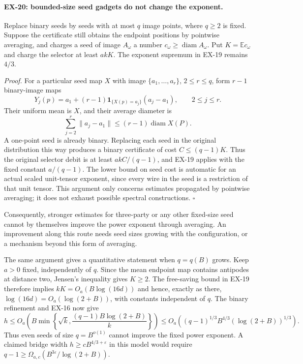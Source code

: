\paragraph{EX-20: bounded-size seed gadgets do not change the exponent.}
Replace binary seeds by seeds with at most $q$ image points, where
$q\geq2$ is fixed. Suppose the certificate still obtains the endpoint
positions by pointwise averaging, and charges a seed of image $A_\omega$
a number $c_\omega\geq\operatorname{diam}A_\omega$. Put
$K=\mathbb E c_\omega$ and charge the selector at least $akK$.
The exponent supremum in EX-19 remains $4/3$.

\emph{Proof.}
For a particular seed map $X$ with image
$\{a_1,\ldots,a_r\}$, $2\leq r\leq q$, form $r-1$ binary-image maps
\[
 Y_j(p)=a_1+(r-1)\mathbf 1_{\{X(p)=a_j\}}(a_j-a_1),
 \qquad 2\leq j\leq r.
\]
Their uniform mean is $X$, and their average diameter is
\[
 \sum_{j=2}^r\|a_j-a_1\|
 \leq(r-1)\operatorname{diam}X(P).
\]
A one-point seed is already binary. Replacing each seed in the original
distribution this way produces a binary certificate of cost
$C\leq(q-1)K$. Thus the original selector debit is at least
$a kC/(q-1)$, and EX-19 applies with the fixed constant $a/(q-1)$.
The lower bound on seed cost is automatic for an actual scaled
unit-tensor exponent, since every wire in the seed is a restriction of
that unit tensor. This argument only concerns estimates propagated by
pointwise averaging; it does not exhaust possible spectral constructions.
\hfill$\square$

Consequently, stronger estimates for three-party or any other fixed-size
seed cannot by themselves improve the power exponent through averaging.
An improvement along this route needs seed sizes growing with the
configuration, or a mechanism beyond this form of averaging.

The same argument gives a quantitative statement when $q=q(B)$ grows.
Keep $a>0$ fixed, independently of $q$. Since the mean endpoint map
contains antipodes at distance two, Jensen's inequality gives $K\geq2$.
The free-saving bound in EX-19 therefore implies
$kK=O_a(B\log(16d))$ and hence, exactly as there,
$\log(16d)=O_a(\log(2+B))$, with constants independent of $q$.
The binary refinement and EX-16 now give
\[
 h\leq O_a\!\left(B\min\left\{\sqrt{k},
       \frac{(q-1)B\log(2+B)}{k}\right\}\right)
 \leq O_a\!\left((q-1)^{1/3}B^{4/3}
                       (\log(2+B))^{1/3}\right).
\]
Thus even seeds of size $q=B^{o(1)}$ cannot improve the fixed power
exponent. A claimed bridge width $h\geq cB^{4/3+\varepsilon}$ in this
model would require
$q-1\geq\Omega_{a,c}(B^{3\varepsilon}/\log(2+B))$.

